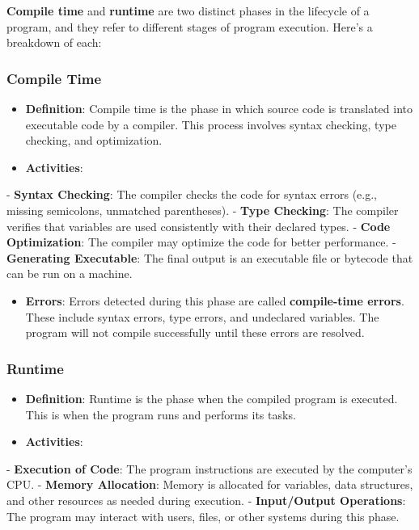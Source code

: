 \begin{botresponse}

\textbf{Compile time} and \textbf{runtime} are two distinct phases in the lifecycle of a program, and they refer to different stages of program execution. Here’s a breakdown of each:

\subsubsection{Compile Time}

\begin{itemize}
\item \textbf{Definition}: Compile time is the phase in which source code is translated into executable code by a compiler. This process involves syntax checking, type checking, and optimization.
\item \textbf{Activities}:
\end{itemize}

- \textbf{Syntax Checking}: The compiler checks the code for syntax errors (e.g., missing semicolons, unmatched parentheses).
- \textbf{Type Checking}: The compiler verifies that variables are used consistently with their declared types.
- \textbf{Code Optimization}: The compiler may optimize the code for better performance.
- \textbf{Generating Executable}: The final output is an executable file or bytecode that can be run on a machine.

\begin{itemize}
\item \textbf{Errors}: Errors detected during this phase are called \textbf{compile-time errors}. These include syntax errors, type errors, and undeclared variables. The program will not compile successfully until these errors are resolved.
\end{itemize}

\subsubsection{Runtime}

\begin{itemize}
\item \textbf{Definition}: Runtime is the phase when the compiled program is executed. This is when the program runs and performs its tasks.
\item \textbf{Activities}:
\end{itemize}

- \textbf{Execution of Code}: The program instructions are executed by the computer's CPU.
- \textbf{Memory Allocation}: Memory is allocated for variables, data structures, and other resources as needed during execution.
- \textbf{Input/Output Operations}: The program may interact with users, files, or other systems during this phase.


\end{botresponse}
